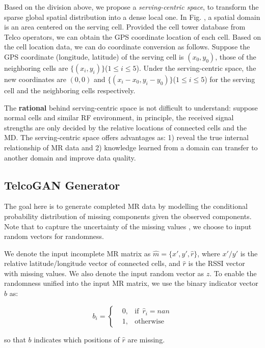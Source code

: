 Based on the division above, we propose a \emph{serving-centric space}, to transform the sparse global spatial distribution into a dense local one. In Fig. , a spatial domain is an area centered on the serving cell. Provided the cell tower database from Telco operators, we can obtain the GPS coordinate location of each cell. Based on the cell location data, we can do coordinate conversion as follows. Suppose the GPS coordinate (longitude, latitude) of the serving cell is $(x_0,y_0)$, those of the neighboring cells are $\{(x_i,y_i)\}$($1\leq i\leq 5$). Under the serving-centric space, the new coordinates are $(0,0)$ and $\{(x_i-x_0,y_i-y_0)\}$($1\leq i\leq 5$) for the serving cell and the neighboring cells respectively.

The \textbf{rational} behind serving-centric space is not difficult to understand: suppose normal cells and similar RF environment, in principle, the received signal strengths are only decided by the relative locations of connected cells and the MD. The serving-centric space offers advantages as: 1) reveal the true internal relationship of MR data and 2) knowledge learned from a domain can transfer to another domain and improve data quality.


\subsection{TelcoGAN Generator}
The goal here is to generate completed MR data by modelling the conditional probability distribution of missing components given the observed components. Note that to capture the uncertainty of the missing values \cite{buuren2010mice}, we choose to input random vectors for randomness.

We denote the input incomplete MR matrix as $\hat{m}=\{x', y', \hat{r}\}$, where $x'/y'$ is the relative latitude/longitude vector of connected cells, and $\hat{r}$ is the RSSI vector with missing values. We also denote the input random vector as $z$. To enable the randomness unified into the input MR matrix, we use the binary indicator vector $b$ as:

\begin{equation}\label{eq:b}
b_i=\left\{
\begin{aligned}
&0, &\text{if}\enspace\hat{r}_i=nan \\
&1, &\text{otherwise}
\end{aligned}
\right.
\end{equation}

so that $b$ indicates which positions of $\hat{r}$ are missing. 

